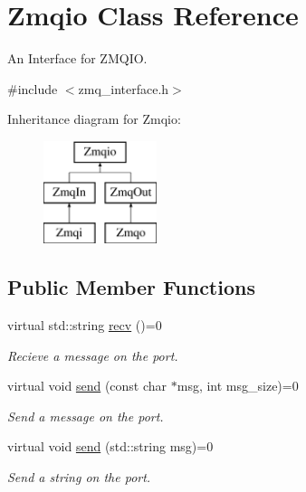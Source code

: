 \hypertarget{classZmqio}{\section{Zmqio Class Reference}
\label{classZmqio}
}


An Interface for Z\-M\-Q\-I\-O.  




{\ttfamily \#include $<$zmq\-\_\-interface.\-h$>$}

Inheritance diagram for Zmqio\-:\begin{figure}[H]
\begin{center}
\leavevmode
\includegraphics[height=3.000000cm]{classZmqio}
\end{center}
\end{figure}
\subsection*{Public Member Functions}
\begin{DoxyCompactItemize}
\item 
\hypertarget{classZmqio_a9365ac0ed42905898502e16857997acc}{virtual std\-::string \hyperlink{classZmqio_a9365ac0ed42905898502e16857997acc}{recv} ()=0}\label{classZmqio_a9365ac0ed42905898502e16857997acc}

\begin{DoxyCompactList}\small\item\em Recieve a message on the port. \end{DoxyCompactList}\item 
\hypertarget{classZmqio_a858e00e8ac5c4d1d60c665fa7c0716f0}{virtual void \hyperlink{classZmqio_a858e00e8ac5c4d1d60c665fa7c0716f0}{send} (const char $\ast$msg, int msg\-\_\-size)=0}\label{classZmqio_a858e00e8ac5c4d1d60c665fa7c0716f0}

\begin{DoxyCompactList}\small\item\em Send a message on the port. \end{DoxyCompactList}\item 
\hypertarget{classZmqio_a079f5752b553ddb2e5a2da565bcf162c}{virtual void \hyperlink{classZmqio_a079f5752b553ddb2e5a2da565bcf162c}{send} (std\-::string msg)=0}\label{classZmqio_a079f5752b553ddb2e5a2da565bcf162c}

\begin{DoxyCompactList}\small\item\em Send a string on the port. \end{DoxyCompactList}\end{DoxyCompactItemize}


